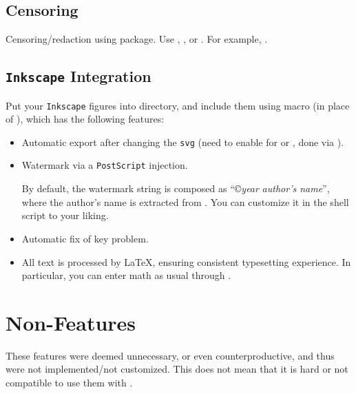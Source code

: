 \subsection{Censoring}%
\label{sub:Censoring}

Censoring/redaction using  package.
Use \macro{\censor}, \macro{\blackout}, or \macro{\censorbox}.
For example, .

\subsection{\texorpdfstring{\texttt{Inkscape}}{Inkscape} Integration}%
\label{sub:Inkscape Integration}

Put your \texttt{Inkscape} figures into  directory, and include them using  macro (in place of ), which has the following features:
\begin{itemize}
    \item Automatic export after changing the \texttt{svg} (need to enable  for  or , done via ).
    \item Watermark via a \texttt{PostScript} injection.
          \begin{remark}
              By default, the watermark string is composed as \enquote{\copyright \textlangle\textit{year}\textrangle{} \textlangle\textit{author's name}\textrangle}, where the author's name is extracted from \custommacro{\ThesisAuthorPlaintext}.
              You can customize it in the shell script  to your liking.
          \end{remark}
    \item Automatic fix of  key problem.
    \item All text is processed by \LaTeX{}, ensuring consistent typesetting experience.
          In particular, you can enter math as usual through .
\end{itemize}


\section{Non-Features}%
\label{sec:Non-Features}

These features were deemed unnecessary, or even counterproductive, and thus were not implemented/not customized.
This does not mean that it is hard or not compatible to use them with \TeXsis{}.

